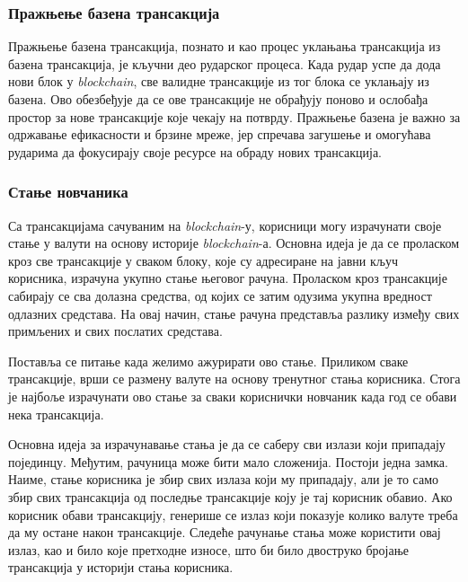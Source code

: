 \documentclass[12pt, a4paper]{article}
\begin{document}
\subsubsection{Пражњење базена трансакција}
Пражњење базена трансакција, познато и као процес уклањања трансакција из базена трансакција, је кључни део рударског процеса. Када рудар успе да дода нови блок у \textit{blockchain}, све валидне трансакције из тог блока се уклањају из базена. Ово обезбеђује да се ове трансакције не обрађују поново и ослобађа простор за нове трансакције које чекају на потврду. Пражњење базена је важно за одржавање ефикасности и брзине мреже, јер спречава загушење и омогућава рударима да фокусирају своје ресурсе на обраду нових трансакција.

\subsubsection{Стање новчаника} 
Са трансакцијама сачуваним на \textit{blockchain}-у, корисници могу израчунати своје стање у валути на основу историје \textit{blockchain}-а. Основна идеја је да се проласком кроз све трансакције у сваком блоку, које су адресиране на јавни кључ корисника, израчуна укупно стање његовог рачуна. Проласком кроз трансакције сабирају се сва долазна средства, од којих се затим одузима укупна вредност одлазних средстава. На овај начин, стање рачуна представља разлику између свих примљених и свих послатих средстава.

Поставља се питање када желимо ажурирати ово стање. Приликом сваке трансакције, врши се размену валуте на основу тренутног стања корисника. Стога је најбоље израчунати ово стање за сваки кориснички новчаник када год се обави нека трансакција. 

Основна идеја за израчунавање стања је да се саберу сви излази који припадају појединцу. Међутим, рачуница може бити мало сложенија. Постоји једна замка. Наиме, стање корисника је збир свих излаза који му припадају, али је то само збир свих трансакција од последње трансакције коју је тај корисник обавио. Ако корисник обави трансакцију, генерише се излаз који показује колико валуте треба да му остане након трансакције. Следеће рачунање стања може користити овај излаз, као и било које претходне износе, што би било двоструко бројање трансакција у историји стања корисника.
\end{document}
